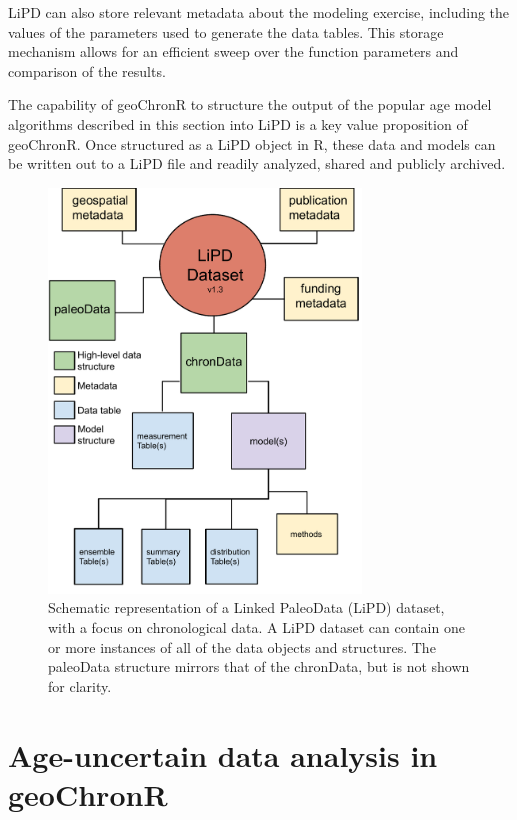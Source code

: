 \documentclass[gchron, manuscript]{copernicus}
\begin{document}
LiPD can also store relevant metadata about the modeling exercise, including the values of the parameters used to generate the data tables. This storage mechanism allows for an efficient sweep over the function parameters and comparison of the results.

The capability of geoChronR to structure the output of the popular age model algorithms described in this section into LiPD is a key value proposition of geoChronR.
Once structured as a LiPD object in R, these data and models can be written out to a LiPD file and readily analyzed, shared and publicly archived.

\begin{figure}
\includegraphics[width=8.3cm]{LPD schematic 1.3 - chronData} \caption{Schematic representation of a Linked PaleoData (LiPD) dataset, with a focus on chronological data. A LiPD dataset can contain one or more instances of all of the data objects and structures. The paleoData structure mirrors that of the chronData, but is not shown for clarity.}\label{fig:lipd-chron}
\end{figure}

\hypertarget{sec:age-uncertain-analysis}{%
\section{Age-uncertain data analysis in geoChronR}\label{sec:age-uncertain-analysis}}
\end{document}
